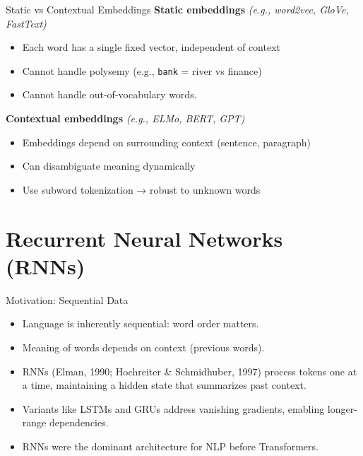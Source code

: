 \documentclass[aspectratio=169]{beamer}
\begin{document}
\begin{frame}{Static vs Contextual Embeddings}
\vspace{1em}
\textbf{Static embeddings}
  \textit{(e.g., word2vec, GloVe, FastText)}
  \begin{itemize}
    \item Each word has a single fixed vector, independent of context
    \item Cannot handle polysemy (e.g., \texttt{bank} = river vs finance)
    \item Cannot handle out-of-vocabulary words.
  \end{itemize}


\textbf{Contextual embeddings}
  \textit{(e.g., ELMo, BERT, GPT)}
  \begin{itemize}
    \item Embeddings depend on surrounding context (sentence, paragraph)
    \item Can disambiguate meaning dynamically
    \item Use subword tokenization → robust to unknown words
  \end{itemize}

\end{frame}




\section{Recurrent Neural Networks (RNNs)}



\begin{frame}{Motivation: Sequential Data}
  \begin{itemize}
    \item Language is inherently sequential: word order matters.
    \item Meaning of words depends on context (previous words).
    \item RNNs (Elman, 1990; Hochreiter \& Schmidhuber, 1997) process tokens one at a time, maintaining a hidden state that summarizes past context.
    \item Variants like LSTMs and GRUs address vanishing gradients, enabling longer-range dependencies.
    \item RNNs were the dominant architecture for NLP before Transformers.
  \end{itemize}
\end{frame}
\end{document}
